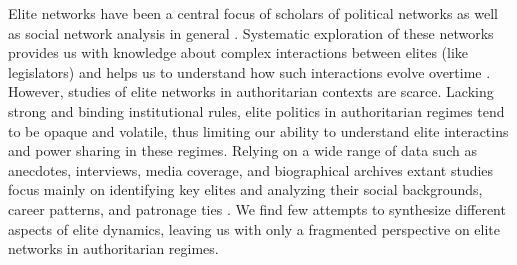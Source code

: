 \documentclass[11pt,english]{article}
\begin{document}
\renewcommand{\footnotesize}{\normalsize}
\renewcommand{\footnotelayout}{\raggedright\doublespacing} %
    \newlength{\myfootnotesep}
    \setlength{\myfootnotesep}{\baselineskip}
    \addtolength{\myfootnotesep}{-\footnotesep}
    \setlength{\footnotesep}{\myfootnotesep} %
\begin{flushleft}
\setlength{\parindent}{2em}
\setlength{\parskip}{0pt}

Elite networks have been a central focus of scholars of political networks as well as social network analysis in general \citep[e.g.,][]{Knoke1993,Ward2011,Liu2015,Gross2017,Larsen2017}. Systematic exploration of these networks provides us with knowledge about complex interactions between elites (like legislators) and helps us to understand how such interactions evolve overtime \citep[e.g.,][]{Parigi2014b,Neal2018}. However, studies of elite networks in authoritarian contexts are scarce. Lacking strong and binding institutional rules, elite politics in authoritarian regimes tend to be opaque and volatile, thus limiting our ability to understand elite interactins and power sharing in these regimes. Relying on a wide range of data such as anecdotes, interviews, media coverage, and biographical archives extant studies focus mainly on identifying key elites and analyzing their social backgrounds, career patterns, and patronage ties \citep[e.g.,][]{Li1989, Levitsky2001, Albrecht2004, Perthes2004, Shih2010, Opper2015, Buehler2017}. We find few attempts to synthesize different aspects of elite dynamics, leaving us with only a fragmented perspective on elite networks in authoritarian regimes.


\end{flushleft}
\end{document}
